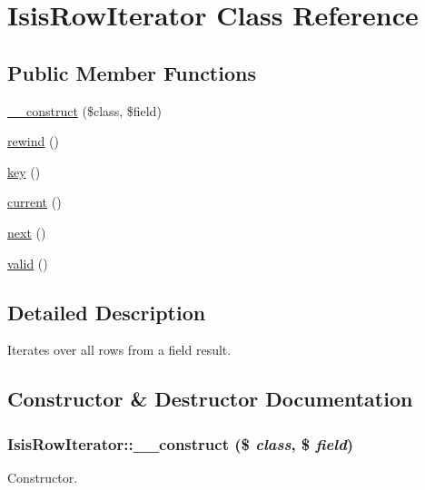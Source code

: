 \hypertarget{classIsisRowIterator}{
\section{IsisRowIterator Class Reference}
\label{classIsisRowIterator}
}
\subsection*{Public Member Functions}
\begin{DoxyCompactItemize}
\item 
\hyperlink{classIsisRowIterator_acaab99d2bf18f6f958ddf07db55cb15d}{\_\-\_\-construct} (\$class, \$field)
\item 
\hyperlink{classIsisRowIterator_a5ef72f942cc738bf24cf251018c28edf}{rewind} ()
\item 
\hyperlink{classIsisRowIterator_a96f65bca7f2e048a449e6f316d802e6f}{key} ()
\item 
\hyperlink{classIsisRowIterator_abe18cfd484f70348fb5832444186b10d}{current} ()
\item 
\hyperlink{classIsisRowIterator_ad084ce947a265969f738e7d7dc8a1853}{next} ()
\item 
\hyperlink{classIsisRowIterator_a69cb2b1c6e8feaffcfe65363a9178b72}{valid} ()
\end{DoxyCompactItemize}


\subsection{Detailed Description}
Iterates over all rows from a field result. 

\subsection{Constructor \& Destructor Documentation}
\hypertarget{classIsisRowIterator_acaab99d2bf18f6f958ddf07db55cb15d}{
\subsubsection[{\_\-\_\-construct}]{\setlength{\rightskip}{0pt plus 5cm}IsisRowIterator::\_\-\_\-construct (\$ {\em class}, \/  \$ {\em field})}}
\label{classIsisRowIterator_acaab99d2bf18f6f958ddf07db55cb15d}
Constructor.


